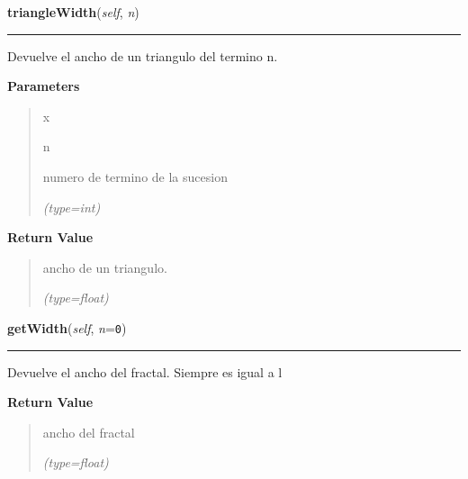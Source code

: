 \hspace{.8\funcindent}\begin{boxedminipage}{\funcwidth}

    \raggedright \textbf{triangleWidth}(\textit{self}, \textit{n})

    \vspace{-1.5ex}

    \rule{\textwidth}{0.5\fboxrule}
\setlength{\parskip}{2ex}
    Devuelve el ancho de un triangulo del termino n.

\setlength{\parskip}{1ex}
      \textbf{Parameters}
      \vspace{-1ex}

      \begin{quote}
        \begin{Ventry}{x}

          \item[n]

          numero de termino de la sucesion

            {\it (type=int)}

        \end{Ventry}

      \end{quote}

      \textbf{Return Value}
    \vspace{-1ex}

      \begin{quote}
      ancho de un triangulo.

      {\it (type=float)}

      \end{quote}

    \end{boxedminipage}

    \label{FractalZE:sierpinsky:Sierpinsky:getWidth}

    \vspace{0.5ex}

\hspace{.8\funcindent}\begin{boxedminipage}{\funcwidth}

    \raggedright \textbf{getWidth}(\textit{self}, \textit{n}={\tt 0})

    \vspace{-1.5ex}

    \rule{\textwidth}{0.5\fboxrule}
\setlength{\parskip}{2ex}
    Devuelve el ancho del fractal. Siempre es igual a l

\setlength{\parskip}{1ex}
      \textbf{Return Value}
    \vspace{-1ex}

      \begin{quote}
      ancho del fractal

      {\it (type=float)}

      \end{quote}

    \end{boxedminipage}

